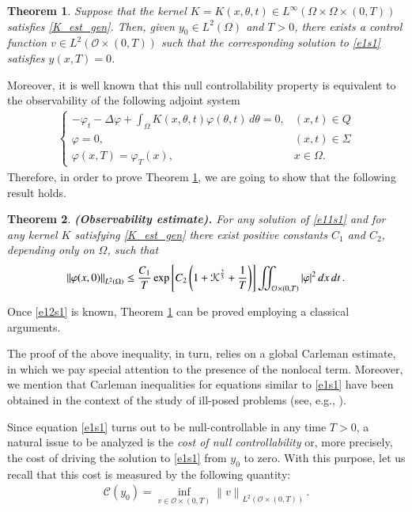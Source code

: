 \documentclass[preprint,1p]{elsarticle}
\newcommand{\D}{\displaystyle}
\newcommand{\norm}[2]{\left\|#1\right\|_{#2}}
\newcommand{\intd}{\displaystyle\int \kern -7pt \int}
\newtheorem{theorem}{\bf Theorem}[section]
\begin{document}
\begin{theorem}\label{control_thm} 
Suppose that the kernel $K=K(x,\theta,t)\in L^\infty(\Omega\times\Omega\times(0,T))$ satisfies \eqref{K_est_gen}. Then, given $y_0\in L^2(\Omega)$ and $T>0$, there exists a control function $v\in L^2(\mathcal{O}\times (0,T))$ such that the corresponding solution to \eqref{e1s1} satisfies $y(x,T)=0$.
\end{theorem}

Moreover, it is well known that this null controllability property is equivalent to the observability of the following adjoint system
\begin{align}\label{e11s1}
	\begin{cases}
		\D-\varphi_t-\Delta\varphi + \int_\Omega K(x,\theta,t)\varphi(\theta,t)\,d\theta = 0, & (x,t)\in Q
		\\
		\varphi = 0, & (x,t)\in \Sigma
		\\
		\varphi(x,T) = \varphi_T(x), & x\in \Omega.
	\end{cases}
\end{align}
Therefore, in order to prove Theorem \ref{control_thm}, we are going to show that the following result holds.

\begin{theorem}\label{th2s1} {\bf(Observability estimate).}
	For any solution of \eqref{e11s1} and for any kernel $K$ satisfying \eqref{K_est_gen} there exist positive constants $C_1$ and $C_2$, depending only on $\Omega$, such that 
	\begin{align}\label{e12s1}
		\norm{\varphi(x,0)}{L^2(\Omega)} \leq \frac{C_1}{T} \exp\left[C_2\left(1 + \mathcal{K}^{\frac 23} +\frac
	1T \right)\right] \intd_{{ \mathcal O}\times(0,T)}|\varphi|^{2}\,dx\,dt\,.
	\end{align}
\end{theorem}
Once \eqref{e12s1} is known, Theorem \ref{control_thm} can be proved employing a classical arguments. 

The proof of the above inequality, in turn, relies on a global Carleman estimate, in which we pay special attention to the presence of the nonlocal term. Moreover, we mention that Carleman inequalities for equations similar to \eqref{e1s1} have been obtained in the context of the study of ill-posed problems (see, e.g., \cite{lorenzi2011two}). 

Since equation \eqref{e1s1} turns out to be null-controllable in any time $T>0$, a natural issue to be analyzed is the {\it cost of null controllability} or, more precisely, the cost of driving the solution to \eqref{e1s1} from $y_0$ to zero. With this purpose, let us recall that this cost is measured by the following quantity:
%
\begin{align}\label{cost}
	\mathcal C(y_0)=\D\inf_{v\in{\mathcal O\times(0,T)}}\norm{v}{L^2(\mathcal O\times(0,T))}\,.
\end{align}
\end{document}
